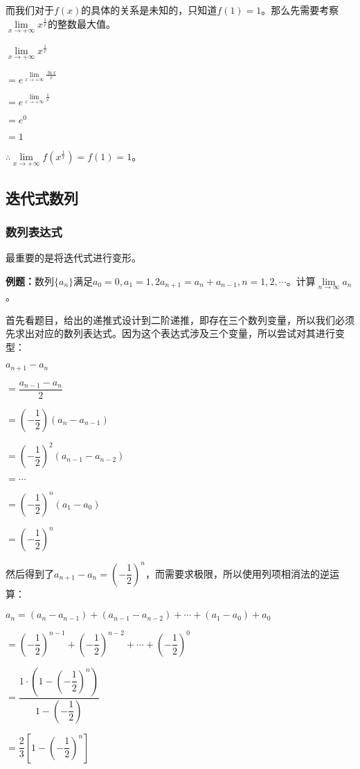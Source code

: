 \documentclass[UTF8, 12pt]{ctexart}
\begin{document}
而我们对于$f(x)$的具体的关系是未知的，只知道$f(1)=1$。那么先需要考察$\lim\limits_{x\to+\infty}x^{\frac{1}{x}}$的整数最大值。

$\lim\limits_{x\to+\infty}x^{\frac{1}{x}}$

$=e^{\lim\limits_{x\to+\infty}\frac{\ln x}{x}}$

$=e^{\lim\limits_{x\to+\infty}\frac{1}{x}}$

$=e^0$

$=1$

$\therefore\lim\limits_{x\to+\infty}f(x^{\frac{1}{x}})=f(1)=1$。

\subsection{迭代式数列}

\subsubsection{数列表达式}

最重要的是将迭代式进行变形。

\textbf{例题：}数列$\{a_n\}$满足$a_0=0,a_1=1,2a_{n+1}=a_n+a_{n-1},n=1,2,\cdots$。计算$\lim\limits_{n\to\infty}a_n$。

首先看题目，给出的递推式设计到二阶递推，即存在三个数列变量，所以我们必须先求出对应的数列表达式。因为这个表达式涉及三个变量，所以尝试对其进行变型：

$a_{n+1}-a_n$

$=\dfrac{a_{n-1}-a_n}{2}$

$=\left(-\dfrac{1}{2}\right)(a_n-a_{n-1})$

$=\left(-\dfrac{1}{2}\right)^2(a_{n-1}-a_{n-2})$

$=\cdots$

$=\left(-\dfrac{1}{2}\right)^n(a_1-a_0)$

$= \left(-\dfrac{1}{2}\right)^n$

然后得到了$a_{n+1}-a_n=\left(-\dfrac{1}{2}\right)^n$，而需要求极限，所以使用列项相消法的逆运算：

$a_n= (a_n-a_{n-1})+(a_{n-1}-a_{n-2})+\cdots+(a_1-a_0)+a_0$\medskip

$= \left(-\dfrac{1}{2}\right)^{n-1} + \left(-\dfrac{1}{2}\right)^{n-2} + \cdots + \left(-\dfrac{1}{2}\right)^0$\medskip

$= \dfrac{1\cdot\left(1-\left(-\dfrac{1}{2}\right)^n\right)}{1-\left(-\dfrac{1}{2}\right)}$\medskip

$= \dfrac{2}{3}\left[1-\left(-\dfrac{1}{2}\right)^n\right]$\medskip
\end{document}
